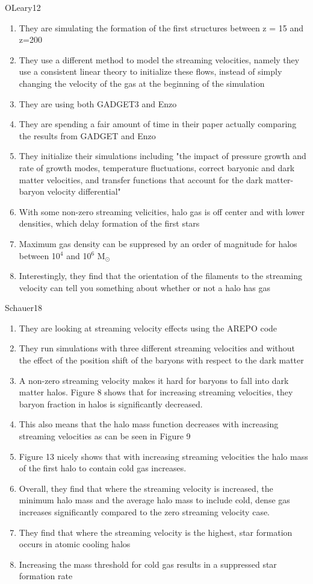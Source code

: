 \documentclass[a4paper,fleqn,usenatbib]{mnras}
\begin{document}
\li OLeary12
\begin{enumerate}
	\item They are simulating the formation of the first structures between z = 15 and z=200
	\item They use a different method to model the streaming velocities, namely they use a consistent linear theory to initialize these flows, instead of simply changing the velocity of the gas at the beginning of the simulation
	\item They are using both GADGET3 and Enzo
	\item They are spending a fair amount of time in their paper actually comparing the results from GADGET and Enzo
	\item They initialize their simulations including "the impact of pressure growth and rate of growth modes, temperature fluctuations, correct baryonic and dark matter velocities, and transfer functions that account for the dark matter-baryon velocity differential"
	\item With some non-zero streaming velicities, halo gas is off center and with lower densities, which delay formation of the first stars
	\item Maximum gas density can be suppresed by an order of magnitude for halos between 10$^{4}$ and 10$^{6}$ M$_{\odot}$
	\item Interestingly, they find that the orientation of the filaments to the streaming velocity can tell you something about whether or not a halo has gas
\end{enumerate}

\li Schauer18
\begin{enumerate}
	\item They are looking at streaming velocity effects using the AREPO code
	\item They run simulations with three different streaming velocities and without the effect of the position shift of the baryons with respect to the dark matter
	\item A non-zero streaming velocity makes it hard for baryons to fall into dark matter halos. Figure 8 shows that for increasing streaming velocities, they baryon fraction in halos is significantly decreased.
	\item This also means that the halo mass function decreases with increasing streaming velocities as can be seen in Figure 9
	\item Figure 13 nicely shows that with increasing streaming velocities the halo mass of the first halo to contain cold gas increases. 
	\item Overall, they find that where the streaming velocity is increased, the minimum halo mass and the average halo mass to include cold, dense gas increases significantly compared to the zero streaming velocity case.
	\item They find that where the streaming velocity is the highest, star formation occurs in atomic cooling halos
	\item Increasing the mass threshold for cold gas results in a suppressed star formation rate
\end{enumerate}
\end{document}
